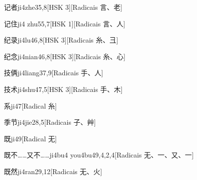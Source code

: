 \begin{entry}{记者}{ji4zhe3}{5,8}[HSK 3][Radicais ⾔、⽼]
\end{entry}

\begin{entry}{记住}{ji4 zhu5}{5,7}[HSK 1][Radicais ⾔、⼈]
\end{entry}

\begin{entry}{纪录}{ji4lu4}{6,8}[HSK 3][Radicais ⽷、⼹]
\end{entry}

\begin{entry}{纪念}{ji4nian4}{6,8}[HSK 3][Radicais ⽷、⼼]
\end{entry}

\begin{entry}{技俩}{ji4liang3}{7,9}[Radicais ⼿、⼈]
\end{entry}

\begin{entry}{技术}{ji4shu4}{7,5}[HSK 3][Radicais ⼿、⽊]
\end{entry}

\begin{entry}{系}{ji4}{7}[Radical ⽷]
\end{entry}

\begin{entry}{季节}{ji4jie2}{8,5}[Radicais ⼦、⾋]
\end{entry}

\begin{entry}{既}{ji4}{9}[Radical ⽆]
\end{entry}

\begin{entry}{既不……又不……}{ji4bu4 you4bu4}{9,4,2,4}[Radicais ⽆、⼀、⼜、⼀]
\end{entry}

\begin{entry}{既然}{ji4ran2}{9,12}[Radicais ⽆、⽕]
\end{entry}

